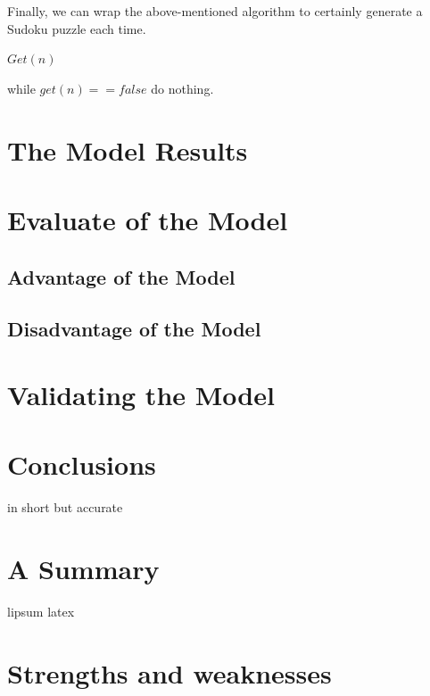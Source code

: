 \documentclass{mcmthesis}
\begin{document}
Finally, we can wrap the above-mentioned algorithm to certainly generate a Sudoku puzzle each time.

\begin{framed}
\begin{list}{.}
{\setlength{\parsep}{0ex}\setlength{\itemsep}{0ex}}
\item[] $Get(n)$
\item[] while $get(n) == false$ do nothing.
\end{list}
\end{framed}
\section{The Model Results}


\section{Evaluate of the Model}
\subsection{Advantage of the Model}
\subsection{Disadvantage of the Model}

\section{Validating the Model}


\section{Conclusions}
in short but accurate

\section{A Summary}
\lipsum[6]
lipsum latex

\section{Strengths and weaknesses}
\lipsum[12]
\end{document}
